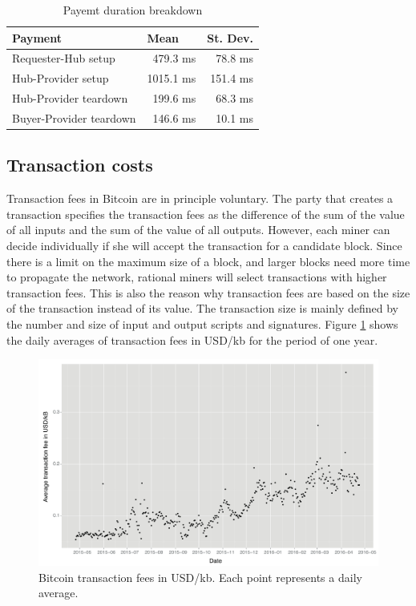\documentclass[10pt,journal,compsoc]{IEEEtran}
\begin{document}
\begin{table}
\centering
\caption{Payemt duration breakdown}
\begin{tabular}{|l|r|r|}
\hline
{\bf Payment } & \multicolumn{1}{l|}{{\bf Mean}} & \multicolumn{1}{l|}{{\bf St. Dev.}} \\ \hline
Requester-Hub setup             & 479.3 ms                 & 78.8 ms                      \\ \hline
Hub-Provider setup            & 1015.1 ms                & 151.4 ms                     \\ \hline
Hub-Provider teardown         & 199.6 ms                 & 68.3 ms                      \\ \hline
Buyer-Provider teardown          & 146.6 ms                 & 10.1 ms                      \\ \hline
\end{tabular}

\label{tbl:performance}
\end{table} 


\subsection{Transaction costs}
\label{sec:fees}
Transaction fees in Bitcoin are in principle voluntary. The party that creates a transaction specifies the transaction fees as the difference of the sum of the value of all inputs and the sum of the value of all outputs. However, each miner can decide individually if she will accept the transaction for a candidate block. Since there is a limit on the maximum size of a block, and larger blocks need more time to propagate the network, rational miners will select transactions with higher transaction fees. This is also the reason why transaction fees are based on the size of the transaction instead of its value. The transaction size is mainly defined by the number and size of input and output scripts and signatures. Figure \ref{fig:tx_fees} shows the daily averages of transaction fees in USD/kb for the period of one year.

\begin{figure}[!t]
\centering
\includegraphics[width=\linewidth]{fees_per_kb}
\caption{Bitcoin transaction fees in USD/kb. Each point represents a daily average.}
\label{fig:tx_fees}
\end{figure}
\end{document}
